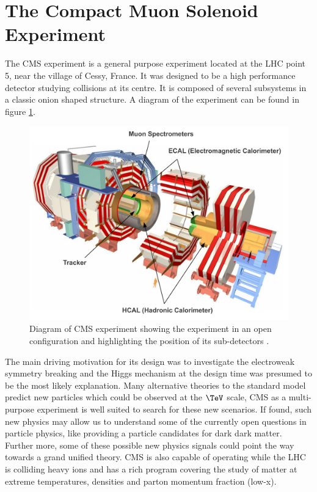 \section{The Compact Muon Solenoid Experiment}
\label{SECTION:ExperimentalApparatus_CMS}


The \acrfull{CMS} experiment is a general purpose experiment located at the \gls{LHC} point 5, near the village of Cessy, France. It was designed to be a high performance detector studying collisions at its centre. It is composed of several subsystems in a classic onion shaped structure. A diagram of the experiment can be found in figure \ref{FIGURE:ExperimentalApparatus_CMS_Layout_Diagram}.

\begin{figure}[!htb]
  \centering
  \includegraphics[width=1.00\textwidth]{Chapter02/CMS/Images/CMS_Layout_Diagram.pdf}
  \caption{Diagram of \gls{CMS} experiment showing the experiment in an open configuration and highlighting the position of its sub-detectors \cite{IMAGEREF:CERNPublic_CMSDiagram}.}
  \label{FIGURE:ExperimentalApparatus_CMS_Layout_Diagram}
\end{figure}

The main driving motivation for its design was to investigate the electroweak symmetry breaking and the Higgs mechanism at the design time was presumed to be the most likely explanation. Many alternative theories to the standard model predict new particles which could be observed at the $\TeV$ scale, \gls{CMS} as a multi-purpose experiment is well suited to search for these new scenarios. If found, such new physics may allow us to understand some of the currently open questions in particle physics, like providing a particle candidates for dark dark matter. Further more, some of these possible new physics signals could point the way towards a grand unified theory. \gls{CMS} is also capable of operating while the \gls{LHC} is colliding heavy ions and has a rich program covering the study of matter at extreme temperatures, densities and parton momentum fraction (low-x).

